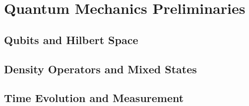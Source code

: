 \chapter{Quantum Mechanics Preliminaries}
\section{Qubits and Hilbert Space}
\section{Density Operators and Mixed States}
\section{Time Evolution and Measurement}

